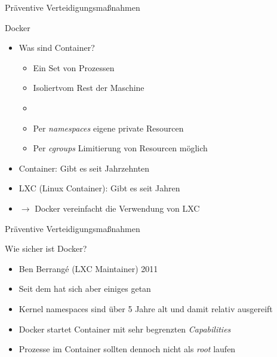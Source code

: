 \begin{frame}{Präventive Verteidigungsmaßnahmen}
  \begin{block}{Docker}
    \begin{itemize}[<+->]
      \item Was sind Container?
      \begin{itemize}[<+->]
        \item Ein Set von Prozessen
        \item Isoliert\footnotemark vom Rest der Maschine
        \item \textbf{}\footnotemark
        \item Per \textit{namespaces} eigene private Resourcen
        \item Per \textit{cgroups} Limitierung von Resourcen möglich
      \end{itemize}
      \item Container: Gibt es seit Jahrzehnten
      \item LXC (Linux Container): Gibt es seit Jahren
      \item $\rightarrow$ Docker vereinfacht die Verwendung von LXC
    \end{itemize}
  \end{block}

\end{frame}

\begin{frame}{Präventive Verteidigungsmaßnahmen}
  \begin{block}{Wie sicher ist Docker?}
    \begin{itemize}[<+->]
      \item {} Ben Berrangé (LXC Maintainer) 2011\footnotemark
      \item Seit dem hat sich aber einiges getan
      \item Kernel namespaces sind über 5 Jahre alt und damit relativ ausgereift
      \item Docker startet Container mit sehr begrenzten \textit{Capabilities}
      \item Prozesse im Container sollten dennoch nicht als \textit{root} laufen
    \end{itemize}
  \end{block}

\end{frame}

